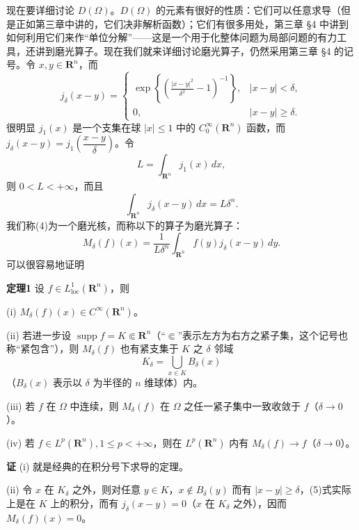 现在要详细讨论 $D(\Omega)$。$D(\Omega)$ 的元素有很好的性质：它们可以任意求导（但是正如第三章中讲的，它们决非解析函数）；它们有很多用处，第三章 §4 中讲到如何利用它们来作“单位分解”——这是一个用于化整体问题为局部问题的有力工具，还讲到磨光算子。现在我们就来详细讨论磨光算子，仍然采用第三章 §4 的记号。令 $x,y\in\mathbf R^n$，而
\begin{equation}
 j_\delta(x-y)=
 \begin{cases}
 \displaystyle\exp\!\left\{\left(\frac{|x-y|^2}{\delta^2}-1\right)^{-1}\right\},&|x-y|<\delta,\\[8pt]
 0,&|x-y|\ge\delta.
 \end{cases}
 \tag{4}
\end{equation}
很明显 $j_1(x)$ 是一个支集在球 $|x|\le1$ 中的 $C_0^\infty(\mathbf R^n)$ 函数，而 $j_\delta(x-y)=j_1\!\left(\dfrac{x-y}{\delta}\right)$。令
\[
 L=\int_{\mathbf R^n}j_1(x)\,dx,
\]
则 $0<L<+\infty$，而且
\[
 \int_{\mathbf R^n}j_\delta(x-y)\,dx=L\delta^n.
\]
我们称(4)为一个磨光核，而称以下的算子为磨光算子：
\begin{equation}
 M_\delta(f)(x)=\frac1{L\delta^n}\int_{\mathbf R^n}f(y)j_\delta(x-y)\,dy.
 \tag{5}
\end{equation}
可以很容易地证明

\noindent\textbf{定理1}
设 $f\in L^1_{\mathrm{loc}}(\mathbf R^n)$，则

\noindent (i) $M_\delta(f)(x)\in C^\infty(\mathbf R^n)$。

\noindent (ii) 若进一步设 $\operatorname{supp}f=K\Subset\mathbf R^n$（“$\Subset$”表示左方为右方之紧子集，这个记号也称“紧包含”），则 $M_\delta(f)$ 也有紧支集于 $K$ 之 $\delta$ 邻域
\[
 K_\delta=\bigcup_{x\in K}B_\delta(x)
\]
（$B_\delta(x)$ 表示以 $\delta$ 为半径的 $n$ 维球体）内。

\noindent (iii) 若 $f$ 在 $\Omega$ 中连续，则 $M_\delta(f)$ 在 $\Omega$ 之任一紧子集中一致收敛于 $f$（$\delta\to0$）。

\noindent (iv) 若 $f\in L^p(\mathbf R^n),1\le p<+\infty$，则在 $L^p(\mathbf R^n)$ 内有 $M_\delta(f)\to f$（$\delta\to0$）。

\noindent\textbf{证}
(i) 就是经典的在积分号下求导的定理。

(ii) 令 $x$ 在 $K_\delta$ 之外，则对任意 $y\in K$，$x\notin B_\delta(y)$ 而有 $|x-y|\ge\delta$，(5)式实际上是在 $K$ 上的积分，而有 $j_\delta(x-y)=0$（$x$ 在 $K_\delta$ 之外），因而 $M_\delta(f)(x)=0$。

